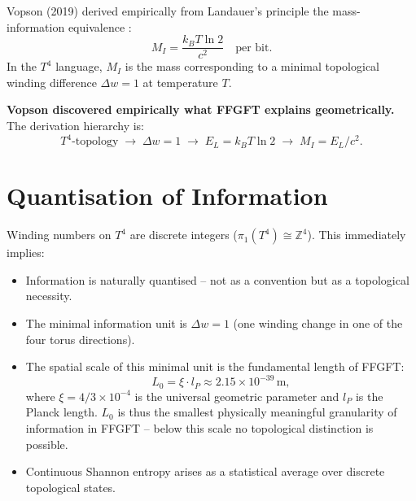 Vopson (2019) derived empirically from Landauer's principle
the mass-information equivalence \cite{Vopson2019}:
\begin{equation}
  M_I = \frac{k_B T \ln 2}{c^2} \quad \text{per bit.}
  \label{eq:vopson}
\end{equation}
In the \(T^4\) language, \(M_I\) is the mass corresponding to
a minimal topological winding difference \(\Delta w = 1\)
at temperature \(T\).

\textbf{Vopson discovered empirically what FFGFT explains geometrically.}
The derivation hierarchy is:
\begin{equation}
  T^4\text{-topology} \;\longrightarrow\;
  \Delta w = 1 \;\longrightarrow\;
  E_L = k_B T \ln 2 \;\longrightarrow\;
  M_I = E_L / c^2.
\end{equation}

\section{Quantisation of Information}

Winding numbers on \(T^4\) are discrete integers
(\(\pi_1(T^4) \cong \mathbb{Z}^4\)).
This immediately implies:

\begin{itemize}
  \item Information is naturally quantised --
        not as a convention but as a topological necessity.
  \item The minimal information unit is \(\Delta w = 1\)
        (one winding change in one of the four torus directions).
  \item The spatial scale of this minimal unit is the
        fundamental length of FFGFT:
        \begin{equation}
          L_0 = \xi \cdot l_P \approx 2.15 \times 10^{-39}\,\text{m},
        \end{equation}
        where \(\xi = 4/3 \times 10^{-4}\) is the universal geometric
        parameter and \(l_P\) is the Planck length.
        \(L_0\) is thus the smallest physically meaningful
        granularity of information in FFGFT -- below this scale
        no topological distinction is possible.
  \item Continuous Shannon entropy arises as a statistical
        average over discrete topological states.
\end{itemize}

